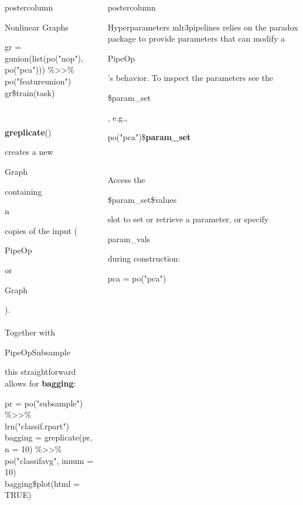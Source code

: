 \documentclass{beamer}
\newlength{\columnheight} %
\newcommand{\codeinline}[1]{\begin{codeboxinline}#1\end{codeboxinline}}
\begin{document}
\begin{frame}[fragile]{}
\begin{columns}
\begin{column}{.245\textwidth}
\begin{beamercolorbox}[center]{postercolumn}
\begin{minipage}{.98\textwidth}
{\begin{myblock}{Nonlinear Graphs}
\begin{codeboxexample}
{                  gr = gunion(list(po("nop"), po("pca"))) \%>>\%\\
                  \hspace*{1ex} po("featureunion")\\
                  gr\$train(task)}
              \end{codeboxexample}
              \ \\
              \codeinline{\textbf{greplicate}()} creates a new \codeinline{Graph} containing \codeinline{n} copies of the input (\codeinline{PipeOp} or \codeinline{Graph}). \\
              \ \\
              Together with \codeinline{PipeOpSubsample} this straightforward allows for \textbf{bagging}:
              \begin{codeboxexample}
						    {\footnotesize
                  pr = po("subsample") \%>>\% lrn("classif.rpart") \\
                  bagging = greplicate(pr, n = 10) \%>>\%\\
                  \hspace*{1ex} po("classifavg", innum = 10)\\
                  bagging\$plot(html = TRUE)}
					    \end{codeboxexample}
            \end{myblock}
						\vfill}
				\end{minipage}
			\end{beamercolorbox}
		\end{column}
    \begin{column}{.245\textwidth}
			\begin{beamercolorbox}[center]{postercolumn}
				\begin{minipage}{.98\textwidth}
					\parbox[t][\columnheight]{\textwidth}{
            \begin{myblock}{Hyperparameters}
              mlr3pipelines relies on the paradox package to provide parameters that can modify a \codeinline{PipeOp}'s behavior. To inspect the parameters see the \codeinline{\$param\_set}, e.g., \codeinline{po("pca")\$\textbf{param\_set}}\\
              \ \\
              Access the \codeinline{\$param\_set\$values} slot to set or retrieve a parameter, or specify \codeinline{param\_vals} during construction:
              \begin{codeboxmultiline}[width=25cm]
                pca = po("pca") \\

\end{codeboxmultiline}
\end{myblock}}
\end{minipage}
\end{beamercolorbox}
\end{column}
\end{columns}
\end{frame}
\end{document}
